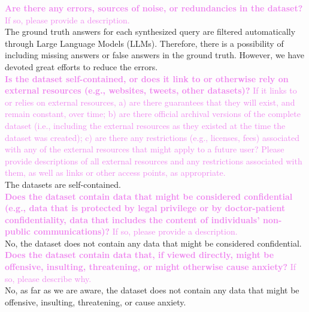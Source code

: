 \documentclass{article}
\newcommand{\sectioncolor}{Violet}
\begin{document}
    \textcolor{\sectioncolor}{\textbf{
    Are there any errors, sources of noise, or redundancies in the dataset?
    }
    If so, please provide a description.
    } \\
    The ground truth answers for each synthesized query are filtered automatically through Large Language Models (LLMs). Therefore, there is a possibility of including missing answers or false answers in the ground truth. However, we have devoted great efforts to reduce the errors.   \\
    
    \textcolor{\sectioncolor}{\textbf{
    Is the dataset self-contained, or does it link to or otherwise rely on
    external resources (e.g., websites, tweets, other datasets)?
    }
    If it links to or relies on external resources, a) are there guarantees
    that they will exist, and remain constant, over time; b) are there official
    archival versions of the complete dataset (i.e., including the external
    resources as they existed at the time the dataset was created); c) are
    there any restrictions (e.g., licenses, fees) associated with any of the
    external resources that might apply to a future user? Please provide
    descriptions of all external resources and any restrictions associated with
    them, as well as links or other access points, as appropriate.
    } \\
    The datasets are self-contained. \\
    
    \textcolor{\sectioncolor}{\textbf{
    Does the dataset contain data that might be considered confidential (e.g.,
    data that is protected by legal privilege or by doctor-patient
    confidentiality, data that includes the content of individuals’ non-public
    communications)?
    }
    If so, please provide a description.
    } \\
    No, the dataset does not contain any data that might be considered confidential. \\
    
    \textcolor{\sectioncolor}{\textbf{
    Does the dataset contain data that, if viewed directly, might be offensive,
    insulting, threatening, or might otherwise cause anxiety?
    }
    If so, please describe why.
    } \\
    No, as far as we are aware, the dataset does not contain any data that might be offensive, insulting, threatening, or cause anxiety. \\
    
\end{document}
